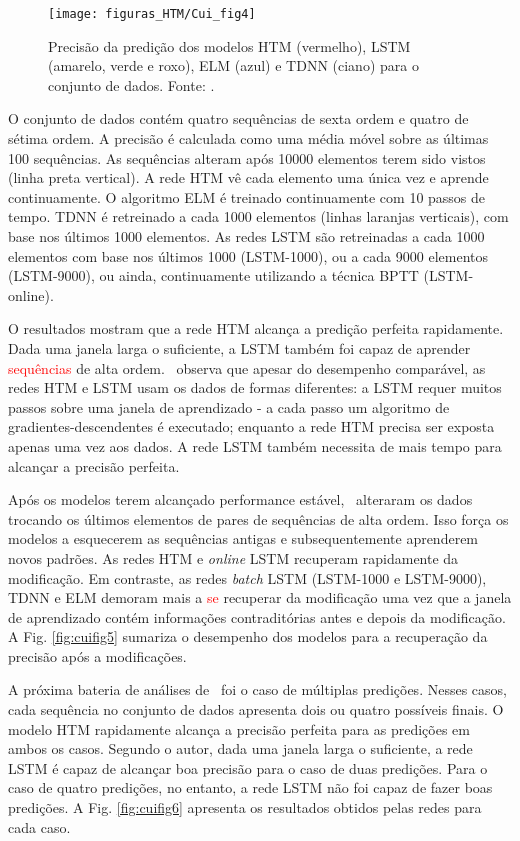 \begin{figure}[H]
	\centering
	\texttt{[image: figuras\_HTM/Cui\_fig4]}
	\caption{Precisão da predição dos modelos HTM (vermelho), LSTM (amarelo, verde e roxo), ELM (azul) e TDNN (ciano) para o conjunto de dados. Fonte: \cui.}
	\label{fig:cuifig4}
\end{figure}

O conjunto de dados contém quatro sequências de sexta ordem e quatro de sétima ordem. A precisão é calculada como uma média móvel sobre as últimas 100 sequências. As sequências alteram após 10000 elementos terem sido vistos (linha preta vertical). A rede HTM vê cada elemento uma única vez e aprende continuamente. O algoritmo ELM é treinado continuamente com 10 passos de tempo. TDNN é retreinado a cada 1000 elementos (linhas laranjas verticais), com base nos últimos 1000 elementos. As redes LSTM são retreinadas a cada 1000 elementos com base nos últimos 1000 (LSTM-1000), ou a cada 9000 elementos (LSTM-9000), ou ainda, continuamente utilizando a técnica BPTT (LSTM-online).

O resultados mostram que a rede HTM alcança a predição perfeita rapidamente. Dada uma janela larga o suficiente, a LSTM também foi capaz de aprender \textcolor{red}{sequências} de alta ordem. \cui \ observa que apesar do desempenho comparável, as redes HTM e LSTM usam os dados de formas diferentes: a LSTM requer muitos passos sobre uma janela de aprendizado - a cada passo um algoritmo de gradientes-descendentes é executado; enquanto a rede HTM precisa ser exposta apenas uma vez aos dados. A rede LSTM também necessita de mais tempo para alcançar a precisão perfeita.

Após os modelos terem alcançado performance estável, \cui \ alteraram os dados trocando os últimos elementos de pares de sequências de alta ordem. Isso força os modelos a esquecerem as sequências antigas e subsequentemente aprenderem novos padrões. As redes HTM e \textit{online} LSTM recuperam rapidamente da modificação. Em contraste, as redes \textit{batch} LSTM (LSTM-1000 e LSTM-9000), TDNN e ELM demoram mais a \textcolor{red}{se} recuperar da modificação uma vez que a janela de aprendizado contém informações contraditórias antes e depois da modificação. A Fig. \ref{fig:cuifig5} sumariza o desempenho dos modelos para a recuperação da precisão após a modificações. 

A próxima bateria de análises de \cui \ foi o caso de múltiplas predições. Nesses casos, cada sequência no conjunto de dados apresenta dois ou quatro possíveis finais. O modelo HTM rapidamente alcança a precisão perfeita para as predições em ambos os casos. Segundo o autor, dada uma janela larga o suficiente, a rede LSTM é capaz de alcançar boa precisão para o caso de duas predições. Para o caso de quatro predições, no entanto, a rede LSTM não foi capaz de fazer boas predições. A Fig. \ref{fig:cuifig6} apresenta os resultados obtidos pelas redes para cada caso.


